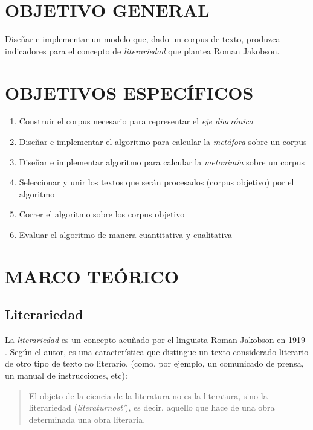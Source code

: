 \documentclass[12pt,letterpaper,twoside]{article}
\begin{document}
\section{OBJETIVO GENERAL}
\label{sec:org6c59e88}
Diseñar e implementar un modelo que, dado un corpus de texto, produzca
indicadores para el concepto de \emph{literariedad} que plantea Roman Jakobson.

\section{OBJETIVOS ESPECÍFICOS}
\label{sec:org2a60bd8}

\begin{enumerate}
\item Construir el corpus necesario para representar el \emph{eje diacrónico}
\item Diseñar e implementar el algoritmo para calcular la \emph{metáfora} sobre un corpus
\item Diseñar e implementar algoritmo para calcular la \emph{metonimia} sobre un corpus
\item Seleccionar y unir los textos que serán procesados (corpus objetivo) por el algoritmo
\item Correr el algoritmo sobre los corpus objetivo
\item Evaluar el algoritmo de manera cuantitativa y cualitativa
\end{enumerate}

\section{MARCO TEÓRICO}
\label{sec:orgb8c084a}

\subsection{Literariedad}
\label{sec:org10aca2d}



La \emph{literariedad} es un concepto acuñado por el lingüista Roman
Jakobson en 1919 \cite{jakobson1981linguistica}. Según el autor, es
una característica que distingue un texto considerado literario de
otro tipo de texto no literario, (como, por ejemplo, un comunicado
de prensa, un manual de instrucciones, etc):


\begin{quote}
El objeto de la ciencia de la literatura no es la literatura, sino
la literariedad (\emph{literaturnost'}), es decir, aquello que hace
de una obra determinada una obra
literaria. \cite[pg. 37]{eijembaum2010teoria}
\end{quote}
\end{document}
